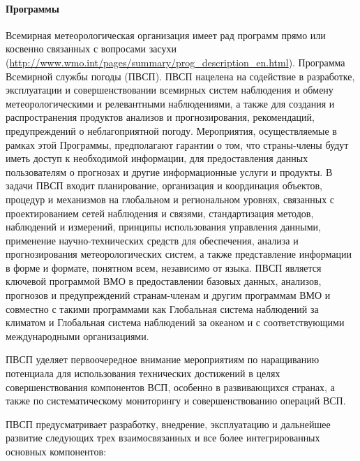 \paragraph{Программы}

Всемирная метеорологическая организация имеет рад программ прямо или косвенно связанных с вопросами засухи \cite{Agalceva2012} (\url{http://www.wmo.int/pages/summary/prog_description_en.html}).
Программа Всемирной службы погоды (ПВСП). ПВСП нацелена на содействие в разработке, эксплуатации и совершенствовании всемирных систем наблюдения и обмену метеорологическими и релевантными наблюдениями, а также для создания и распространения продуктов анализов и прогнозирования, рекомендаций, предупреждений о неблагоприятной погоду. Мероприятия, осуществляемые в рамках этой Программы, предполагают гарантии о том, что страны-члены будут иметь доступ к необходимой информации, для предоставления данных пользователям о прогнозах и другие информационные услуги и продукты.
В задачи ПВСП входит планирование, организация и координация объектов, процедур и механизмов на глобальном и региональном уровнях, связанных с проектированием сетей наблюдения и связями, стандартизация методов, наблюдений и измерений, принципы использования управления данными, применение научно-технических средств для обеспечения, анализа и прогнозирования метеорологических систем, а также представление информации в форме и формате, понятном всем, независимо от языка. ПВСП является ключевой программой ВМО в предоставлении базовых данных, анализов, прогнозов и предупреждений странам-членам и другим программам ВМО и совместно с такими программами как Глобальная система наблюдений за климатом и Глобальная система наблюдений за океаном и с соответствующими международными организациями.

ПВСП уделяет первоочередное внимание мероприятиям по наращиванию потенциала для использования технических достижений в целях совершенствования компонентов ВСП, особенно в развивающихся странах, а также по систематическому мониторингу и совершенствованию операций ВСП.

ПВСП предусматривает разработку, внедрение, эксплуатацию и дальнейшее развитие следующих трех взаимосвязанных и все более интегрированных основных компонентов:

